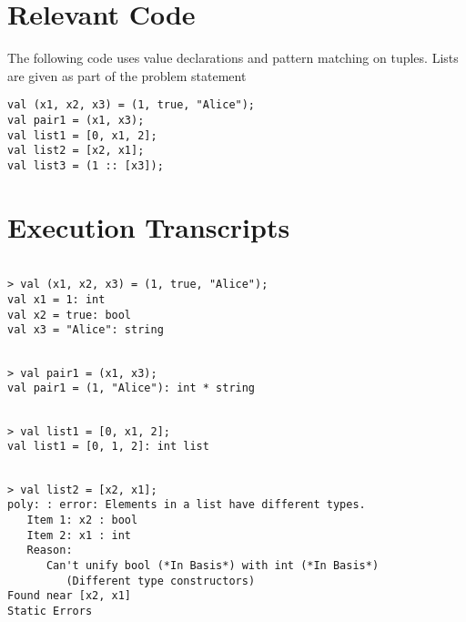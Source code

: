 \documentclass{report}
\begin{document}
\section{Relevant Code}
\label{sec:relevant-code-2}

The following code uses value declarations and pattern
matching on tuples. Lists are given as part of the problem statement

\lstset{frameround=tftf}
\begin{lstlisting}[frame=trbl]
val (x1, x2, x3) = (1, true, "Alice");
val pair1 = (x1, x3);
val list1 = [0, x1, 2];
val list2 = [x2, x1];
val list3 = (1 :: [x3]);
\end{lstlisting}

\section{Execution Transcripts}
\label{sec:execution-transc-2}

\setcounter{sessioncount}{0}
\begin{session}
\begin{scriptsize}
\begin{verbatim}

> val (x1, x2, x3) = (1, true, "Alice");
val x1 = 1: int
val x2 = true: bool
val x3 = "Alice": string
\end{verbatim}
\end{scriptsize}
\end{session}

\begin{session}
\begin{scriptsize}
\begin{verbatim}

> val pair1 = (x1, x3);
val pair1 = (1, "Alice"): int * string
\end{verbatim}
\end{scriptsize}
\end{session}

\begin{session}
\begin{scriptsize}
\begin{verbatim}

> val list1 = [0, x1, 2];
val list1 = [0, 1, 2]: int list
\end{verbatim}
\end{scriptsize}
\end{session}

\begin{session}
\begin{scriptsize}
\begin{verbatim}

> val list2 = [x2, x1];
poly: : error: Elements in a list have different types.
   Item 1: x2 : bool
   Item 2: x1 : int
   Reason:
      Can't unify bool (*In Basis*) with int (*In Basis*)
         (Different type constructors)
Found near [x2, x1]
Static Errors
\end{verbatim}
\end{scriptsize}
\end{session}
\end{document}
